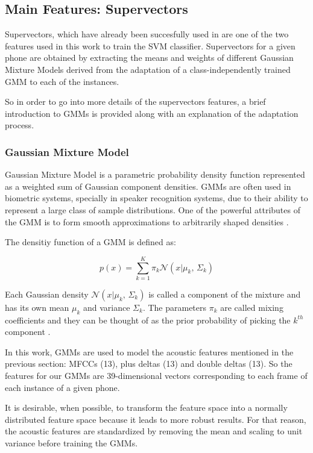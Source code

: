 \subsection{Main Features: Supervectors}

Supervectors, which have already been succesfully used in
\cite{supervectors, main} are one of the two features used in this work to train the SVM
classifier. Supervectors for a given phone are obtained by extracting the means and weights
of different
Gaussian Mixture Models derived from the adaptation of a class-independently trained GMM
to each of the instances.

So in order to go into more details of the supervectors features, a brief introduction to
GMMs is provided along with an explanation of the adaptation process.

\subsubsection{Gaussian Mixture Model}

Gaussian Mixture Model is a parametric probability density function represented as a weighted
sum of Gaussian component densities. GMMs are often used in biometric systems, specially
in speaker recognition systems, due to their ability to represent a large class of sample
distributions. One of the powerful attributes of the GMM is to form smooth approximations to
arbitrarily shaped densities \cite{gmm_reynolds}.

The densitiy function of a GMM is defined as:

\begin{equation}
  p(x) = \sum_{k=1}^{K}\pi_{k} \mathcal{N}(x|\mu_{k},\,\Sigma_{k})
\end{equation}

Each Gaussian density $\mathcal{N}(x|\mu_{k},\,\Sigma_{k})$ is called a component of the mixture
and has its own mean $\mu_{k}$ and variance $\Sigma_{k}$. The parameters $\pi_{k}$ are called
mixing coefficients and they can be thought of as the prior probability of picking the $k^{th}$
component \cite{gmm_bishop}.

In this work, GMMs are used to model the acoustic features mentioned in the previous section:
MFCCs (13), plus deltas (13) and double deltas (13). So the features for our GMMs are
39-dimensional vectors corresponding to each frame of each instance of a given phone.

It is desirable, when possible, to transform the feature space into a normally distributed feature
space because it leads to more robust results. For that reason, the acoustic features are
standardized by removing the mean and scaling to unit variance before training the GMMs.

